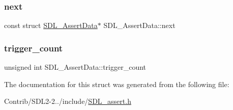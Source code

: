 \mbox{\label{struct_s_d_l___assert_data_a2081dcf06dce4df497e423bccddfc099}} 
\subsubsection{\texorpdfstring{next}{next}}
{\footnotesize\ttfamily const struct \mbox{\hyperlink{struct_s_d_l___assert_data}{S\+D\+L\+\_\+\+Assert\+Data}}$\ast$ S\+D\+L\+\_\+\+Assert\+Data\+::next}

\mbox{\label{struct_s_d_l___assert_data_a230bbcc2d115aab04cf817773e08eb5b}} 
\subsubsection{\texorpdfstring{trigger\+\_\+count}{trigger\_count}}
{\footnotesize\ttfamily unsigned int S\+D\+L\+\_\+\+Assert\+Data\+::trigger\+\_\+count}



The documentation for this struct was generated from the following file\+:\begin{DoxyCompactItemize}
\item 
Contrib/\+S\+D\+L2-\/2../include/\mbox{\hyperlink{_s_d_l__assert_8h}{S\+D\+L\+\_\+assert.\+h}}\end{DoxyCompactItemize}

